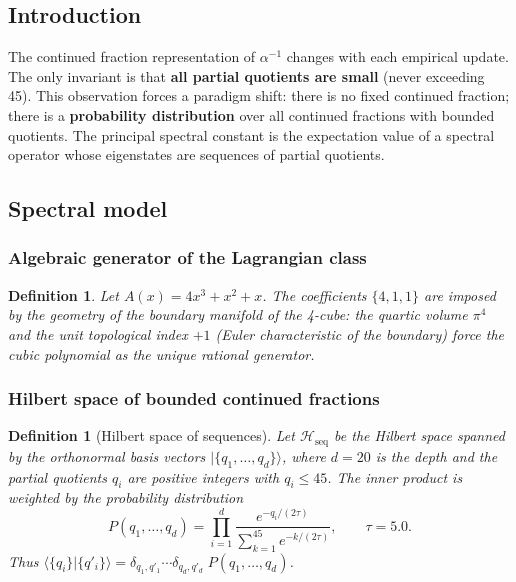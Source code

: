 \documentclass[12pt]{article}
\numberwithin{equation}{section}
\newtheorem{definition}[theorem]{Definition}
\begin{document}
\subsection{Introduction}

The continued fraction representation of \(\alpha^{-1}\) changes with each empirical update. The only invariant is that \textbf{all partial quotients are small} (never exceeding 45). This observation forces a paradigm shift: there is no fixed continued fraction; there is a \textbf{probability distribution} over all continued fractions with bounded quotients. The principal spectral constant is the expectation value of a spectral operator whose eigenstates are sequences of partial quotients.

\subsection{Spectral model}

\subsubsection{Algebraic generator of the Lagrangian class}

\begin{definition}\label{def:generator}
Let \(A(x) = 4x^3 + x^2 + x\). The coefficients \(\{4,1,1\}\) are imposed by the geometry of the boundary manifold of the 4-cube: the quartic volume \(\pi^4\) and the unit topological index \(+1\) (Euler characteristic of the boundary) force the cubic polynomial as the unique rational generator.
\end{definition}

\subsubsection{Hilbert space of bounded continued fractions}

\begin{definition}[Hilbert space of sequences]\label{def:hilbert_seq}
Let \(\mathcal{H}_{\text{seq}}\) be the Hilbert space spanned by the orthonormal basis vectors \(|\{q_1,\dots,q_d\}\rangle\), where \(d=20\) is the depth and the partial quotients \(q_i\) are positive integers with \(q_i \le 45\). The inner product is weighted by the probability distribution
\[
P(q_1,\dots,q_d) = \prod_{i=1}^d \frac{e^{-q_i/(2\tau)}}{\sum_{k=1}^{45} e^{-k/(2\tau)}},\qquad \tau=5.0.
\]
Thus \(\langle \{q_i\} | \{q'_i\} \rangle = \delta_{q_1,q'_1}\cdots\delta_{q_d,q'_d}\; P(q_1,\dots,q_d)\).
\end{definition}
\end{document}
